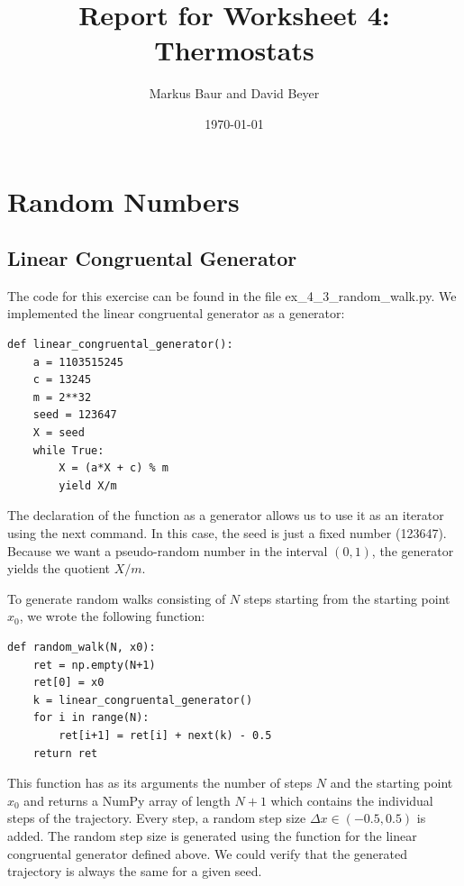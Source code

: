 \documentclass[a4paper,10pt,bibtotoc]{scrartcl}
\begin{document}
\titlehead{Simulation Methods in Physics I \hfill WS 2019/2010}
\title{Report for Worksheet 4: Thermostats}
\author{Markus Baur and David Beyer}
\date{\today}
\maketitle

\tableofcontents

\section{Random Numbers}
\subsection{Linear Congruental Generator}
The code for this exercise can be found in the file ex\_4\_3\_random\_walk.py.
We implemented the linear congruental generator as a generator:
\begin{lstlisting}
def linear_congruental_generator():
    a = 1103515245
    c = 13245
    m = 2**32
    seed = 123647
    X = seed
    while True:
        X = (a*X + c) % m
        yield X/m
\end{lstlisting}
The declaration of the function as a generator allows us to use it as an iterator using the next command. 
In this case, the seed is just a fixed number (123647). Because we want a pseudo-random number in the interval $(0,1)$, the generator yields the quotient $X/m$.

To generate random walks consisting of $N$ steps starting from the starting point $x_0$, we wrote the following function:
\begin{lstlisting}
def random_walk(N, x0):
    ret = np.empty(N+1)
    ret[0] = x0
    k = linear_congruental_generator()
    for i in range(N):
        ret[i+1] = ret[i] + next(k) - 0.5
    return ret
\end{lstlisting}
This function has as its arguments the number of steps $N$ and the starting point $x_0$ and returns a NumPy array of length $N+1$ which contains the individual steps of the trajectory.
Every step, a random step size $\Delta x\in (-0.5,0.5)$ is added.
The random step size is generated using the function for the linear congruental generator defined above.
We could verify that the generated trajectory is always the same for a given seed.
\end{document}
